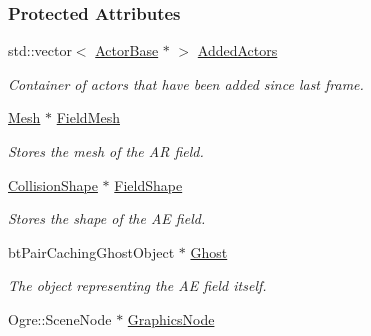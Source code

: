 \subsubsection*{Protected Attributes}
\begin{DoxyCompactItemize}
\item 
\hypertarget{classphys_1_1AreaEffect_a5bd2ad15db98ecc140a8bf2fee8d0c1f}{
std::vector$<$ \hyperlink{classphys_1_1ActorBase}{ActorBase} $\ast$ $>$ \hyperlink{classphys_1_1AreaEffect_a5bd2ad15db98ecc140a8bf2fee8d0c1f}{AddedActors}}
\label{classphys_1_1AreaEffect_a5bd2ad15db98ecc140a8bf2fee8d0c1f}

\begin{DoxyCompactList}\small\item\em Container of actors that have been added since last frame. \item\end{DoxyCompactList}\item 
\hypertarget{classphys_1_1AreaEffect_a435c71f4871e9364c29c8d38ebfa09d1}{
\hyperlink{classphys_1_1Mesh}{Mesh} $\ast$ \hyperlink{classphys_1_1AreaEffect_a435c71f4871e9364c29c8d38ebfa09d1}{FieldMesh}}
\label{classphys_1_1AreaEffect_a435c71f4871e9364c29c8d38ebfa09d1}

\begin{DoxyCompactList}\small\item\em Stores the mesh of the AR field. \item\end{DoxyCompactList}\item 
\hypertarget{classphys_1_1AreaEffect_a444fd63345d6dbd0d4ec3ec7a289657a}{
\hyperlink{classphys_1_1CollisionShape}{CollisionShape} $\ast$ \hyperlink{classphys_1_1AreaEffect_a444fd63345d6dbd0d4ec3ec7a289657a}{FieldShape}}
\label{classphys_1_1AreaEffect_a444fd63345d6dbd0d4ec3ec7a289657a}

\begin{DoxyCompactList}\small\item\em Stores the shape of the AE field. \item\end{DoxyCompactList}\item 
\hypertarget{classphys_1_1AreaEffect_ae730c591bf929404f337d71d4119bde8}{
btPairCachingGhostObject $\ast$ \hyperlink{classphys_1_1AreaEffect_ae730c591bf929404f337d71d4119bde8}{Ghost}}
\label{classphys_1_1AreaEffect_ae730c591bf929404f337d71d4119bde8}

\begin{DoxyCompactList}\small\item\em The object representing the AE field itself. \item\end{DoxyCompactList}\item 
\hypertarget{classphys_1_1AreaEffect_a7fbb785d7357cc7eac68dc94bb72c18a}{
Ogre::SceneNode $\ast$ \hyperlink{classphys_1_1AreaEffect_a7fbb785d7357cc7eac68dc94bb72c18a}{GraphicsNode}}
\label{classphys_1_1AreaEffect_a7fbb785d7357cc7eac68dc94bb72c18a}


\end{DoxyCompactItemize}
